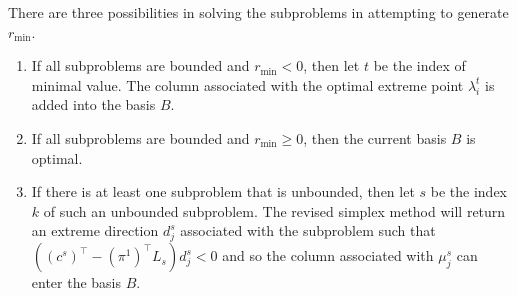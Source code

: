 There are three possibilities in solving the subproblems in attempting
to generate $r_{\min}$.
\begin{enumerate}
    \item If all subproblems are bounded and $r_{\min}<0$, then let $t$ be the index of minimal value. The column associated with the optimal extreme point $\lambda_i^t$ is added into the basis $B$.
    \item If all subproblems are bounded and $r_{\min}\geq 0$, then the current basis $B$ is optimal.
    \item If there is at least one subproblem that is unbounded, then let $s$ be the index $k$ of such an unbounded subproblem. The revised simplex method will return an extreme direction $d_j^s$ associated with the subproblem such that $((c^s)^\top -(\pi^1)^\top L_s)d_j^s<0$ and so the column associated with $\mu_j^s$ can enter the basis $B$.
\end{enumerate}

    

